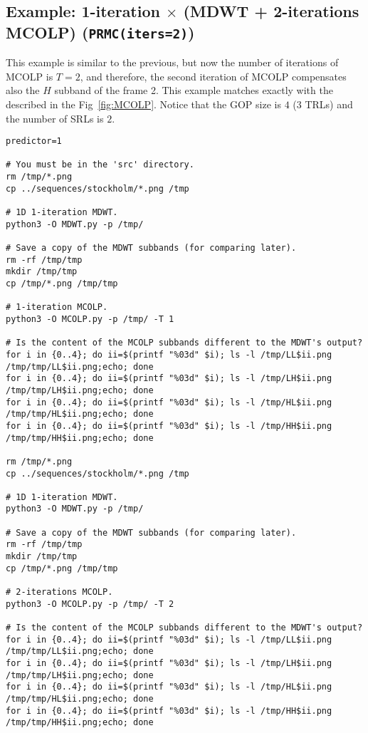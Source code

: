 
\subsection*{Example: 1-iteration $\times$ (MDWT + 2-iterations MCOLP) (\texttt{PRMC(iters=2)})}

This example is similar to the previous, but now the number of
iterations of MCOLP is $T=2$, and therefore, the second iteration of
MCOLP compensates also the $H$ subband of the frame 2. This example
matches exactly with the described in the Fig~\ref{fig:MCOLP}. Notice
that the GOP size is $4$ ($3$ TRLs) and the number of SRLs is $2$.

\begin{verbatim}
predictor=1

# You must be in the 'src' directory.
rm /tmp/*.png
cp ../sequences/stockholm/*.png /tmp

# 1D 1-iteration MDWT.
python3 -O MDWT.py -p /tmp/

# Save a copy of the MDWT subbands (for comparing later).
rm -rf /tmp/tmp
mkdir /tmp/tmp
cp /tmp/*.png /tmp/tmp

# 1-iteration MCOLP.
python3 -O MCOLP.py -p /tmp/ -T 1

# Is the content of the MCOLP subbands different to the MDWT's output?
for i in {0..4}; do ii=$(printf "%03d" $i); ls -l /tmp/LL$ii.png /tmp/tmp/LL$ii.png;echo; done
for i in {0..4}; do ii=$(printf "%03d" $i); ls -l /tmp/LH$ii.png /tmp/tmp/LH$ii.png;echo; done
for i in {0..4}; do ii=$(printf "%03d" $i); ls -l /tmp/HL$ii.png /tmp/tmp/HL$ii.png;echo; done
for i in {0..4}; do ii=$(printf "%03d" $i); ls -l /tmp/HH$ii.png /tmp/tmp/HH$ii.png;echo; done

rm /tmp/*.png
cp ../sequences/stockholm/*.png /tmp

# 1D 1-iteration MDWT.
python3 -O MDWT.py -p /tmp/

# Save a copy of the MDWT subbands (for comparing later).
rm -rf /tmp/tmp
mkdir /tmp/tmp
cp /tmp/*.png /tmp/tmp

# 2-iterations MCOLP.
python3 -O MCOLP.py -p /tmp/ -T 2

# Is the content of the MCOLP subbands different to the MDWT's output?
for i in {0..4}; do ii=$(printf "%03d" $i); ls -l /tmp/LL$ii.png /tmp/tmp/LL$ii.png;echo; done
for i in {0..4}; do ii=$(printf "%03d" $i); ls -l /tmp/LH$ii.png /tmp/tmp/LH$ii.png;echo; done
for i in {0..4}; do ii=$(printf "%03d" $i); ls -l /tmp/HL$ii.png /tmp/tmp/HL$ii.png;echo; done
for i in {0..4}; do ii=$(printf "%03d" $i); ls -l /tmp/HH$ii.png /tmp/tmp/HH$ii.png;echo; done


\end{verbatim}
